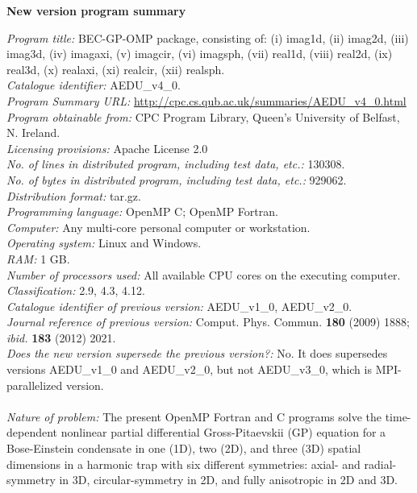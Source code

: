 \documentclass[onecolumn,3p]{elsarticle}
\begin{document}
\begin{small}
\noindent
{\bf New version program summary}

\noindent
{\em Program title:} BEC-GP-OMP package, consisting of: (i) imag1d, (ii) imag2d, (iii) imag3d, (iv) imagaxi, (v) imagcir, (vi) imagsph, (vii) real1d, (viii) real2d, (ix) real3d, (x) realaxi, (xi) realcir, (xii) realsph. \\
{\em Catalogue identifier:} AEDU\_v4\_0.\\
{\em Program Summary URL:} \href{http://cpc.cs.qub.ac.uk/summaries/AEDU_v4_0.html}{http://cpc.cs.qub.ac.uk/summaries/AEDU\_v4\_0.html}\\
{\em Program obtainable from:} CPC Program Library, Queen's University of Belfast, N. Ireland.\\
{\em Licensing provisions:} Apache License 2.0\\
{\em No. of lines in distributed program, including test data, etc.:} 130308. \\
{\em No. of bytes in distributed program, including test data, etc.:} 929062.\\
{\em Distribution format:} tar.gz.\\
{\em Programming language:} OpenMP C; OpenMP Fortran.\\
{\em Computer:} Any multi-core personal computer or workstation. \\
{\em Operating system:} Linux and Windows.\\
{\em RAM:} 1 GB.\\
{\em Number of processors used:} All available CPU cores on the executing computer. \\
{\em Classification:} 2.9, 4.3, 4.12.\\
{\em Catalogue identifier of previous version:} AEDU\_v1\_0, AEDU\_v2\_0.\\
{\em Journal reference of previous version:} Comput. Phys. Commun. \textbf{180} (2009) 1888; {\it ibid.} \textbf{183} (2012) 2021.\\
{\em Does the new version supersede the previous version?:} No. It does supersedes versions AEDU\_v1\_0 and AEDU\_v2\_0, but not AEDU\_v3\_0, which is MPI-parallelized version.\\

\noindent\\
{\em Nature of problem:}
The present OpenMP Fortran and C programs solve the time-dependent nonlinear partial differential Gross-Pitaevskii (GP) equation for a Bose-Einstein 
condensate in one (1D), two (2D), and three (3D) spatial dimensions in a harmonic trap with six different symmetries: axial- and radial-symmetry in 3D, circular-symmetry 
in 2D, and fully anisotropic in 2D and 3D.


\end{small}
\end{document}
